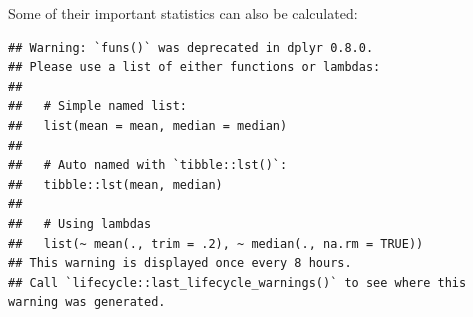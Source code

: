 \documentclass[
]{article}
\newenvironment{Shaded}{\begin{snugshade}}{\end{snugshade}}
\newcommand{\AttributeTok}[1]{\textcolor[rgb]{0.80,0.80,0.80}{#1}}
\newcommand{\FloatTok}[1]{\textcolor[rgb]{0.75,0.75,0.82}{#1}}
\newcommand{\FunctionTok}[1]{\textcolor[rgb]{0.94,0.94,0.56}{#1}}
\newcommand{\NormalTok}[1]{\textcolor[rgb]{0.80,0.80,0.80}{#1}}
\newcommand{\OtherTok}[1]{\textcolor[rgb]{0.94,0.94,0.56}{#1}}
\newcommand{\SpecialCharTok}[1]{\textcolor[rgb]{0.86,0.64,0.64}{#1}}
\newcommand{\StringTok}[1]{\textcolor[rgb]{0.80,0.58,0.58}{#1}}
\begin{document}
Some of their important statistics can also be calculated:

\begin{Shaded}
\end{Shaded}

\begin{verbatim}
## Warning: `funs()` was deprecated in dplyr 0.8.0.
## Please use a list of either functions or lambdas: 
## 
##   # Simple named list: 
##   list(mean = mean, median = median)
## 
##   # Auto named with `tibble::lst()`: 
##   tibble::lst(mean, median)
## 
##   # Using lambdas
##   list(~ mean(., trim = .2), ~ median(., na.rm = TRUE))
## This warning is displayed once every 8 hours.
## Call `lifecycle::last_lifecycle_warnings()` to see where this warning was generated.
\end{verbatim}
\end{document}

